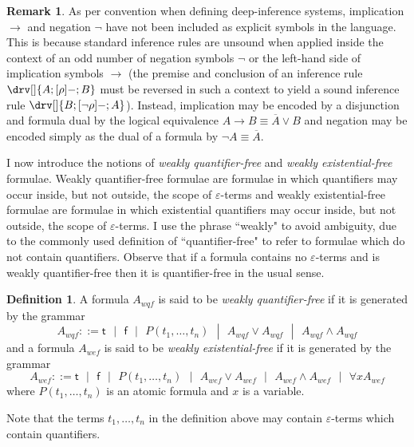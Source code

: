 \documentclass[10pt]{article}
\theoremstyle{definition}\newtheorem{remark}[theorem]{Remark}
\theoremstyle{definition}\newtheorem{example}[theorem]{Example}
\theoremstyle{definition}\newtheorem{definition}[theorem]{Definition}
\newcommand{\trueUnit}{\mathsf{t}}
\newcommand{\falseUnit}{\mathsf{f}}
\begin{document}
	\begin{remark}
		As per convention when defining deep-inference systems, implication $\rightarrow$ and negation $\neg$ have not been included as explicit symbols in the language. This is because standard inference rules are unsound when applied inside the context of an odd number of negation symbols $\neg$ or the left-hand side of implication symbols $\rightarrow$ (the premise and conclusion of an inference rule $\drv[] {A ; [\rho]- ; B}$ must be reversed in such a context to yield a sound inference rule $\drv[] {B ; [\neg \rho]- ; A}$). Instead, implication may be encoded by a disjunction and formula dual by the logical equivalence $A \rightarrow B \equiv \overline{A} \lor B$ and negation may be encoded simply as the dual of a formula by $\neg A \equiv \overline{A}$.
	\end{remark}

	I now introduce the notions of \textit{weakly quantifier-free} and \textit{weakly existential-free} formulae. Weakly quantifier-free formulae are formulae in which quantifiers may occur inside, but not outside, the scope of $\varepsilon$-terms and weakly existential-free formulae are formulae in which existential quantifiers may occur inside, but not outside, the scope of $\varepsilon$-terms. I use the phrase ``weakly" to avoid ambiguity, due to the commonly used definition of ``quantifier-free" to refer to formulae which do not contain quantifiers. Observe that if a formula contains no $\varepsilon$-terms and is weakly quantifier-free then it is quantifier-free in the usual sense.
	
	\begin{definition}
		A formula $A_{wqf}$ is said to be \textit{weakly quantifier-free} if it is generated by the grammar
		\[
		A_{wqf} ::= \trueUnit\text{ }|\text{ }\falseUnit\text{ }|\text{ }P(t_1, \dots, t_n)\text{ }|\text{ }A_{wqf} \lor A_{wqf}\text{ }|\text{ }A_{wqf} \land A_{wqf}
		\]
		and a formula $A_{wef}$ is said to be \textit{weakly existential-free} if it is generated by the grammar
		\[
		A_{wef} ::= \trueUnit\text{ }|\text{ }\falseUnit\text{ }|\text{ }P(t_1, \dots, t_n)\text{ }|\text{ }A_{wef} \lor A_{wef}\text{ }|\text{ }A_{wef} \land A_{wef}\text{ }|\text{ }\forall x A_{wef}
		\]
		where $P(t_1, \dots, t_n)$ is an atomic formula and $x$ is a variable.
	\end{definition}

	Note that the terms $t_1, \dots, t_n$ in the definition above may contain $\varepsilon$-terms which contain quantifiers.
	
\end{document}
